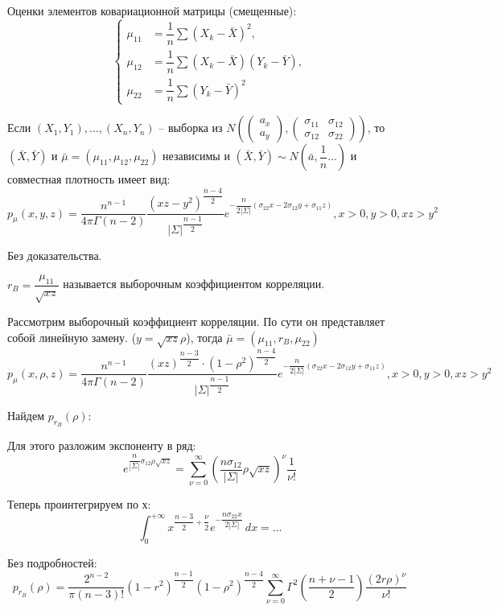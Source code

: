 Оценки элементов ковариационной матрицы (смещенные):
\[
\begin{cases}
  \mu_{11} &= \dfrac{1}{n} \sum (X_k - \bar X)^2, \\
  \mu_{12} &= \dfrac{1}{n} \sum (X_k - \bar X)(Y_k - \bar Y), \\ 
  \mu_{22} &= \dfrac{1}{n} \sum (Y_k - \bar Y)^2
\end{cases}
\]

\begin{theorem}[Фишера]
  Если $(X_1,Y_1), \dots, (X_n, Y_n)$ -- выборка из 
  $N(
    \begin{pmatrix} a_x \\ a_y \end{pmatrix},
    \begin{pmatrix}
      \sigma_{11} & \sigma_{12} \\
      \sigma_{12} & \sigma_{22}
    \end{pmatrix} )$,
  то $(\bar X, \bar Y)$ и $\bar \mu = (\mu_{11}, \mu_{12}, \mu_{22})$ независимы и
  $(\bar X, \bar Y) \sim N( \bar a, \dfrac{1}{n} \dots )$
  и совместная плотность имеет вид:
  \[
    p_{\mu} (x, y, z) = \dfrac{n^{n-1}}{4\pi \Gamma(n-2)} \dfrac{(xz - y^2)^\dfrac{n-4}{2}}{|\Sigma|^\dfrac{n-1}{2}} e^{-\dfrac{n}{2 |\Sigma|} (\sigma_{22} x - 2 \sigma_{12}y + \sigma_{11} z) }, x>0, y>0, xz>y^2
  \]
\end{theorem}
Без доказательства.

\begin{definition}
  $r_B = \dfrac{\mu_{11}}{\sqrt{xz}}$ называется выборочным коэффициентом корреляции.
\end{definition}

\begin{theorem}[Следствие]
  Рассмотрим выборочный коэффициент корреляции. По сути он представляет собой линейную замену.
  ($y = \sqrt{xz} \rho$),
  тогда $\bar \mu = (\mu_{11}, r_B, \mu_{22})$
  \[
    p_\mu (x, \rho, z) = 
    \dfrac{n^{n-1}}{4\pi \Gamma(n-2)}
    \dfrac{(xz)^\dfrac{n-3}{2} \cdot (1-\rho^2)^\dfrac{n-4}{2}}{|\Sigma|^\dfrac{n-1}{2}}
    e^{-\dfrac{n}{2 |\Sigma|} (\sigma_{22} x - 2 \sigma_{12}y + \sigma_{11} z) }, x>0, y>0, xz>y^2
  \]

  Найдем $p_{r_B} (\rho)$:

  Для этого разложим экспоненту в ряд:
  \[
    e^{ \dfrac{n}{|\Sigma|} \sigma_{12} \rho \sqrt{xz} }
    = \sum_{\nu=0}^\infty \left(\dfrac{n \sigma_{12}}{|\Sigma|} \rho \sqrt{xz} \right)^\nu \dfrac{1}{\nu!}
  \]

  Теперь проинтегрируем по х:
  \[
    \int_0^{+\infty} x^{\dfrac{n-3}{2} + \dfrac{\nu}{2}} e^{-\dfrac{n \sigma_{22} x}{2 |\Sigma|}} \, dx = \dots %
  \]

  Без подробностей:
  \[
    p_{r_B} (\rho) = \dfrac{2^{n-2}}{\pi (n-3)!}
    (1 - r^2)^{\dfrac{n-1}{2}}
    (1-\rho^2)^{\dfrac{n-4}{2}}
    \sum_{\nu=0}^\infty \Gamma^2\left(\dfrac{n+\nu-1}{2}\right) \dfrac{(2 r \rho)^\nu}{\nu!}
  \]
\end{theorem}


